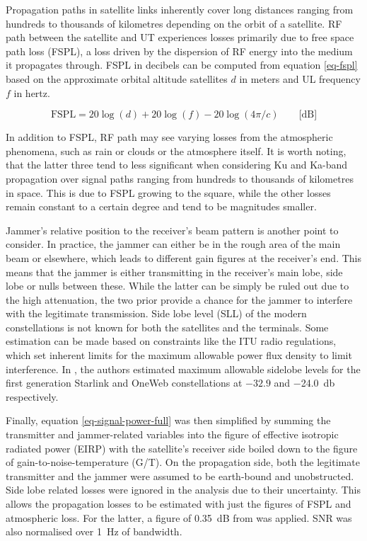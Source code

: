 \documentclass[english, 12pt, a4paper, elec, utf8, a-1b, online]{aaltothesis}
\begin{document}
Propagation paths in satellite links inherently cover long distances ranging from hundreds to thousands of kilometres depending on the orbit of a satellite.
RF path between the satellite and UT experiences losses primarily due to free space path loss (FSPL), a loss driven by the dispersion of RF energy into the medium it propagates through.
FSPL in decibels can be computed from equation \ref{eq-fspl} based on the approximate orbital altitude satellites $d$ in meters and UL frequency $f$ in hertz.

\begin{equation} \label{eq-fspl}
  \mathrm{FSPL} = 20\log(d)+20\log(f)-20\log(4\pi / c) \qquad \text{[dB]}
\end{equation}

In addition to FSPL, RF path may see varying losses from the atmospheric phenomena, such as rain or clouds or the atmosphere itself.
It is worth noting, that the latter three tend to less significant when considering Ku and Ka-band propagation over signal paths ranging from hundreds to thousands of kilometres in space.
This is due to FSPL growing to the square, while the other losses remain constant to a certain degree and tend to be magnitudes smaller.

Jammer's relative position to the receiver's beam pattern is another point to consider. In practice, the jammer can either be in the rough area of the main beam or elsewhere, which leads to different gain figures at the receiver's end. This means that the jammer is either transmitting in the receiver's main lobe, side lobe or nulls between these. While the latter can be simply be ruled out due to the high attenuation, the two prior provide a chance for the jammer to interfere with the legitimate transmission. Side lobe level (SLL) of the modern constellations is not known for both the satellites and the terminals. Some estimation can be made based on constraints like the ITU radio regulations, which set inherent limits for the maximum allowable power flux density to limit interference. In \cite{hills2023controlling}, the authors estimated maximum allowable sidelobe levels for the first generation Starlink and OneWeb constellations at $-32.9$ and \qty{-24.0}{\decibel} respectively. 

Finally, equation \ref{eq-signal-power-full} was then simplified by summing the transmitter and jammer-related variables into the figure of effective isotropic radiated power (EIRP) with the satellite's receiver side boiled down to the figure of gain-to-noise-temperature (G/T).
On the propagation side, both the legitimate transmitter and the jammer were assumed to be earth-bound and unobstructed.
Side lobe related losses were ignored in the analysis due to their uncertainty.
This allows the propagation losses to be estimated with just the figures of FSPL and atmospheric loss.
For the latter, a figure of \SI{0.35}{\deci\bel} from \cite{kymeta2019link} was applied. SNR was also normalised over \SI{1}{\hertz} of bandwidth.
\end{document}
